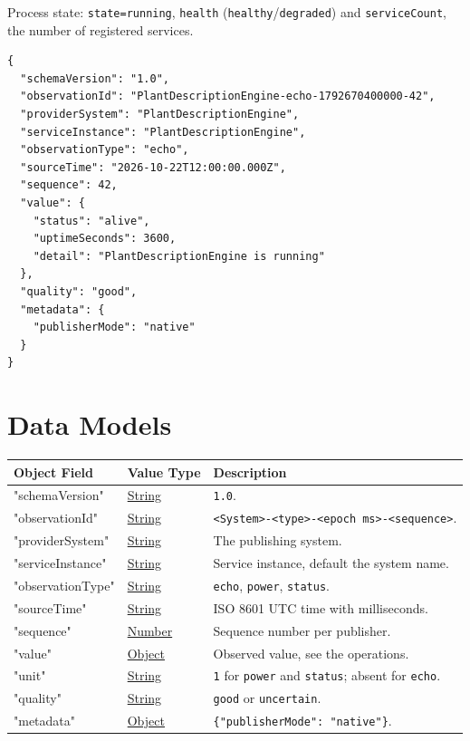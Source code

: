 \documentclass[a4paper]{arrowhead}
\newcommand{\oref}[1]{{\textcolor{ArrowheadBlue}{\hyperref[sec:operations:#1]{#1}}}}
\newcommand{\pref}[1]{{\textcolor{ArrowheadGrey}{\hyperref[sec:model:primitives:#1]{#1}}}}
\begin{document}
Process state: \texttt{state=\allowbreak{}running}, \texttt{health} (\texttt{healthy}/\texttt{degraded}) and \texttt{serviceCount}, the number of registered services.

\begin{lstlisting}[caption={An \oref{echo} observation.}]
{
  "schemaVersion": "1.0",
  "observationId": "PlantDescriptionEngine-echo-1792670400000-42",
  "providerSystem": "PlantDescriptionEngine",
  "serviceInstance": "PlantDescriptionEngine",
  "observationType": "echo",
  "sourceTime": "2026-10-22T12:00:00.000Z",
  "sequence": 42,
  "value": {
    "status": "alive",
    "uptimeSeconds": 3600,
    "detail": "PlantDescriptionEngine is running"
  },
  "quality": "good",
  "metadata": {
    "publisherMode": "native"
  }
}
\end{lstlisting}

\newpage

\section{Data Models}
\label{sec:model}


\noindent\begin{tabularx}{\textwidth}{| p{4.25cm} | p{3.5cm} | X |} \hline
\rowcolor{gray!33} Object Field & Value Type & Description \\ \hline
"schemaVersion" & \pref{String} & \texttt{1.0}. \\ \hline
"observationId" & \pref{String} & \texttt{<System>-<type>-<epoch ms>-<sequence>}. \\ \hline
"providerSystem" & \pref{String} & The publishing system. \\ \hline
"serviceInstance" & \pref{String} & Service instance, default the system name. \\ \hline
"observationType" & \pref{String} & \texttt{echo}, \texttt{power}, \texttt{status}. \\ \hline
"sourceTime" & \pref{String} & ISO 8601 UTC time with milliseconds. \\ \hline
"sequence" & \pref{Number} & Sequence number per publisher. \\ \hline
"value" & \pref{Object} & Observed value, see the operations. \\ \hline
"unit" & \pref{String} & \texttt{1} for \texttt{power} and \texttt{status}; absent for \texttt{echo}. \\ \hline
"quality" & \pref{String} & \texttt{good} or \texttt{uncertain}. \\ \hline
"metadata" & \pref{Object} & \texttt{\{"publisherMode": "native"\}}. \\ \hline
\end{tabularx}
\end{document}
